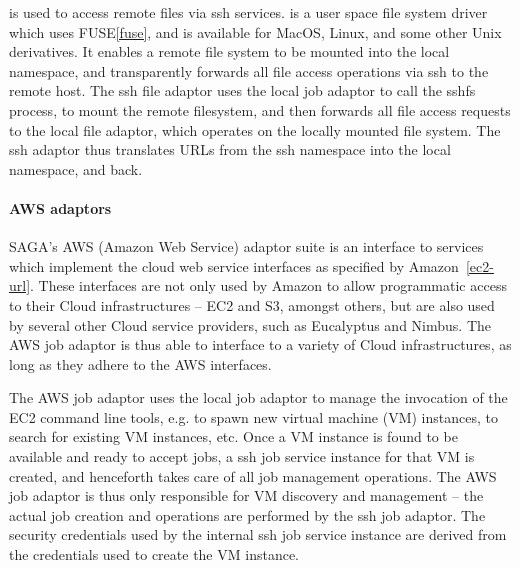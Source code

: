 \documentclass[3p,twocolumn]{elsarticle}
\begin{document}
\sshfs is used to access remote files via ssh services.  \sshfs is a
user space file system driver which uses FUSE\ref{fuse}, and is
available for MacOS, Linux, and some other Unix derivatives.  It
enables a remote file system to be mounted into the local namespace,
and transparently forwards all file access operations via ssh to the
remote host.  The ssh file adaptor uses the local job adaptor to call
the sshfs process, to mount the remote filesystem, and then forwards
all file access requests to the local file adaptor, which operates on
the locally mounted file system.  The ssh adaptor thus translates URLs
from the ssh namespace into the local namespace, and back.


\paragraph{AWS adaptors} 

SAGA's AWS (Amazon Web Service) adaptor suite is an interface to
services which implement the cloud web service interfaces as specified
by Amazon~\ref{ec2-url}.  These interfaces are not only used by Amazon
to allow programmatic access to their Cloud infrastructures -- EC2 and
S3, amongst others, but are also used by several other Cloud service
providers, such as Eucalyptus\cite{eucalyptus} and Nimbus.  The AWS
job adaptor is thus able to interface to a variety of Cloud
infrastructures, as long as they adhere to the AWS interfaces.

The AWS job adaptor uses the local job adaptor to manage the
invocation of the EC2 command line tools, e.g. to spawn new virtual
machine (VM) instances, to search for existing VM instances, etc.
Once a VM instance is found to be available and ready to accept jobs,
a ssh job service instance for that VM is created, and henceforth
takes care of all job management operations.  The AWS job adaptor is
thus only responsible for VM discovery and management -- the actual
job creation and operations are performed by the ssh job adaptor.  The
security credentials used by the internal ssh job service instance are
derived from the credentials used to create the VM instance.
\end{document}
